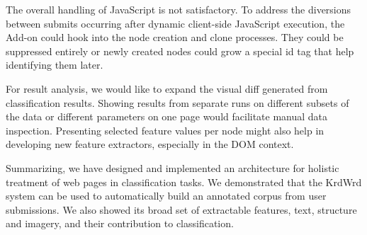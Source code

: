 The overall handling of JavaScript is not satisfactory.
To address the diversions between submits occurring after dynamic client-side JavaScript execution, the Add-on could hook into the node creation and clone processes.
They could be suppressed entirely or newly created nodes could grow a special id tag that help identifying them later.

For result analysis, we would like to expand the visual diff generated from classification results.
Showing results from separate runs on different subsets of the data or different parameters on one page would facilitate manual data inspection.
Presenting selected feature values per node might also help in developing new feature extractors, especially in the DOM context.


Summarizing, we have designed and implemented an architecture for holistic treatment of web pages in classification tasks.
We demonstrated that the KrdWrd system can be used to automatically build an annotated corpus from user submissions.
We also showed its broad set of extractable features, text, structure and imagery, and their contribution to classification.


